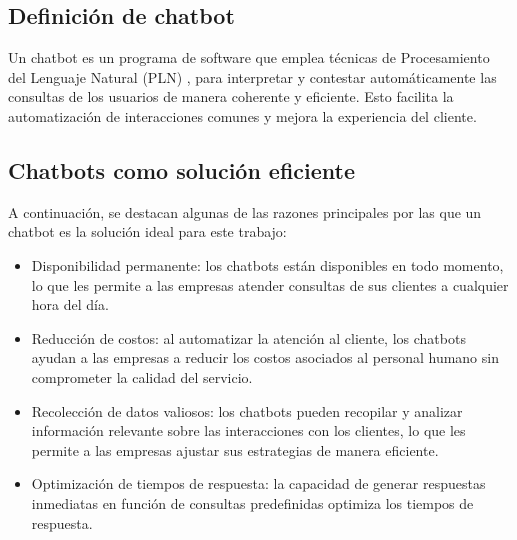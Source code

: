 \subsection{Definición de chatbot}

Un chatbot es un programa de software que emplea técnicas de Procesamiento del Lenguaje Natural (PLN) \citep{ibm-pln}, para interpretar y contestar automáticamente las consultas de los usuarios de manera coherente y eficiente. Esto facilita la automatización de interacciones comunes y mejora la experiencia del cliente.


\subsection{Chatbots como solución eficiente}

A continuación, se destacan algunas de las razones principales por las que un chatbot es la solución ideal para este trabajo:

\begin{itemize}
    \item Disponibilidad permanente: los chatbots están disponibles en todo momento, lo que les permite a las empresas atender consultas de sus clientes a cualquier hora del día.
    
    \item Reducción de costos: al automatizar la atención al cliente, los chatbots ayudan a las empresas a reducir los costos asociados al personal humano sin comprometer la calidad del servicio.
    
    \item Recolección de datos valiosos: los chatbots pueden recopilar y analizar información relevante sobre las interacciones con los clientes, lo que les permite a las empresas ajustar sus estrategias de manera eficiente.
    
    \item Optimización de tiempos de respuesta: la capacidad de generar respuestas inmediatas en función de consultas predefinidas optimiza los tiempos de respuesta.
\end{itemize}




